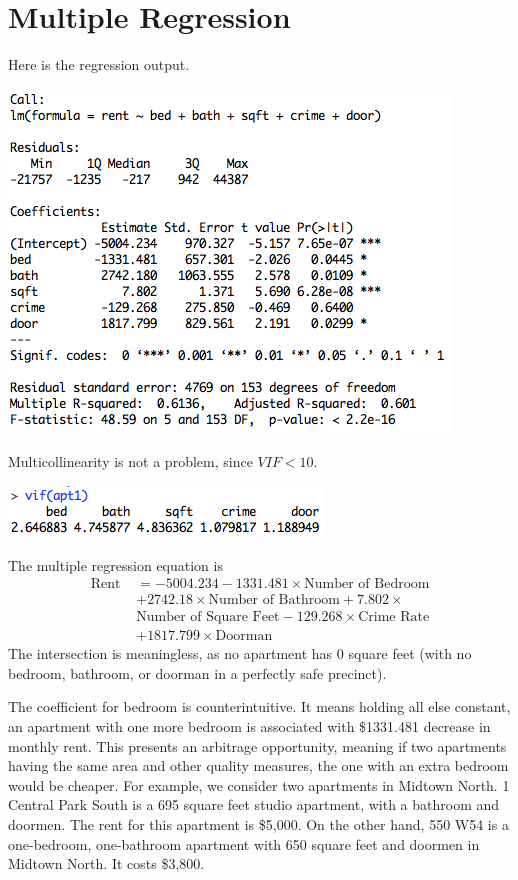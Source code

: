 \documentclass[a4 paper, 11 pt, twocolumn]{article}
\begin{document}
\section{Multiple Regression}
Here is the regression output.
\begin{center}
\includegraphics[scale=0.55]{mr1}
\end{center}
Multicollinearity is not a problem, since $VIF < 10$.
\begin{center}
\includegraphics[scale=0.6]{vif}
\end{center}
The multiple regression equation is
\begin{align*}
\text{Rent } &= -5004.234 -1331.481\times \text{Number of Bedroom} \\
&+ 2742.18\times \text{Number of Bathroom} + 7.802 \times \\ &\text{Number of Square Feet} -129.268\times \text{Crime Rate} \\&+ 1817.799\times \text{Doorman}
\end{align*}
The intersection is meaningless, as no apartment has 0 square feet (with no bedroom, bathroom, or doorman in a perfectly safe precinct).

The coefficient for bedroom is counterintuitive. It means holding all else constant, an apartment with one more bedroom is associated with \$1331.481 decrease in monthly rent. This presents an arbitrage opportunity, meaning if two apartments having the same area and other quality measures, the one with an extra bedroom would be cheaper. For example, we consider two apartments in Midtown North. 1 Central Park South is a 695 square feet studio apartment, with a bathroom and doormen. The rent for this apartment is \$5,000. On the other hand, 550 W54 is a one-bedroom, one-bathroom apartment with 650 square feet and doormen in Midtown North. It costs \$3,800.
\end{document}
